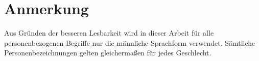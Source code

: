 \chapter*{Anmerkung}

Aus Gründen der besseren Lesbarkeit wird in dieser Arbeit für alle personenbezogenen Begriffe nur die männliche Sprachform verwendet. Sämtliche Personenbezeichnungen gelten gleichermaßen für jedes Geschlecht.